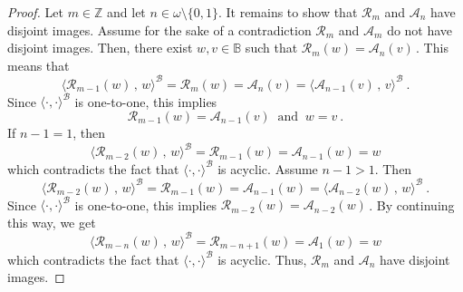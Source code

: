 \documentclass[10pt,a4paper, openany,  oldfontcommands]{memoir}
\newtheorem{open problem} [theorem] {Open Problem}
\newtheorem{open question} [theorem] {Open Question}
\begin{document}
\begin{proof}
Let  $  m  \in  \mathbb{Z}  $  and let  $  n  \in  \omega  \setminus  \lbrace 0, 1  \rbrace  $. 
It remains to show that    $  \mathcal{R}_m   $  and  $   \mathcal{A}_n  $  have disjoint images. 
Assume for the sake of a contradiction $    \mathcal{R}_m   $  and  $   \mathcal{A}_m $  do not have disjoint images. 
Then, there exist  $  w,  v  \in  \mathbb{B}  $  such that  
$     \mathcal{R}_{m}  \left(  w  \right)     =  \mathcal{A}_{n}  \left(  v  \right)     \,   $. 
This means that 
\[
\langle    \mathcal{R}_{m-1}  \left(  w  \right)   \,   ,  \,  w   \rangle^{   \mathcal{B} } 
  =   \mathcal{R}_{m}  \left(  w  \right)    
 =  \mathcal{A}_{n}  \left(  v  \right) 
 = 
 \langle    \mathcal{A}_{n-1}  \left(  v  \right)   \,   ,  \,  v   \rangle^{   \mathcal{B} } 
\    .
\]
Since  $  \langle  \cdot  ,  \cdot  \rangle^{  \mathcal{B} }  $  is one-to-one,  this implies    
\[
\mathcal{R}_{m-1}  \left(  w  \right)    =     \mathcal{A}_{n-1}  \left(  v  \right)    
\   \mbox{  and  }     \     w  =  v  
\      .
\]
If  $  n-1 = 1  $, then  
\[
\langle    \mathcal{R}_{m-2}  \left(  w  \right)    \,   ,  \,  w   \rangle^{   \mathcal{B} }     
= 
\mathcal{R}_{m-1}  \left(  w  \right)    =     \mathcal{A}_{n-1}  \left(  w  \right)      =  w  
\]
which contradicts the fact that  $   \langle  \cdot ,  \cdot   \rangle^{  \mathcal{B}  }  $  is acyclic. 
Assume  $  n-1 >  1  $. 
Then
\[
\langle    \mathcal{R}_{m-2}  \left(  w  \right)    \,   ,  \,  w   \rangle^{   \mathcal{B} }     
= 
\mathcal{R}_{m-1}  \left(  w  \right)    =     \mathcal{A}_{n-1}  \left(  w  \right)      =  
\langle    \mathcal{A}_{n-2}  \left(  w  \right)    \,   ,  \,  w   \rangle^{   \mathcal{B} }     
\      .
\]
Since    $   \langle  \cdot ,  \cdot   \rangle^{  \mathcal{B}  }  $ is one-to-one,  this implies  
$     \mathcal{R}_{m-2}  \left(  w  \right)     =     \mathcal{A}_{n-2}  \left(  w  \right)        \,   $.
By continuing this way, we get 
\[
\langle    \mathcal{R}_{m-n}  \left(  w  \right)    \,   ,  \,  w   \rangle^{   \mathcal{B} }     
= 
\mathcal{R}_{m-n+1}  \left(  w  \right)    =     \mathcal{A}_{1}  \left(  w  \right)      =  w  
\]
which contradicts the fact that  $   \langle  \cdot ,  \cdot   \rangle^{  \mathcal{B}  }  $  is acyclic. 
Thus,  $  \mathcal{R}_m  $  and  $  \mathcal{A}_n $  have disjoint images. 
\end{proof}
\end{document}

